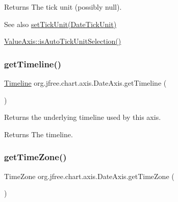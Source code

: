 \begin{DoxyReturn}{Returns}
The tick unit (possibly {\ttfamily null}).
\end{DoxyReturn}
\begin{DoxySeeAlso}{See also}
\mbox{\hyperlink{classorg_1_1jfree_1_1chart_1_1axis_1_1_date_axis_a9a28298c67b281bc6f4dccff9af3fd59}{set\+Tick\+Unit(\+Date\+Tick\+Unit)}} 

\mbox{\hyperlink{classorg_1_1jfree_1_1chart_1_1axis_1_1_value_axis_adc265a92cee6f4f50dcf0701f86d3cab}{Value\+Axis\+::is\+Auto\+Tick\+Unit\+Selection()}} 
\end{DoxySeeAlso}
\mbox{\label{classorg_1_1jfree_1_1chart_1_1axis_1_1_date_axis_aa20fc8c4e5f6f50e17018e6e9e32fc33}} 
\subsubsection{\texorpdfstring{get\+Timeline()}{getTimeline()}}
{\footnotesize\ttfamily \mbox{\hyperlink{interfaceorg_1_1jfree_1_1chart_1_1axis_1_1_timeline}{Timeline}} org.\+jfree.\+chart.\+axis.\+Date\+Axis.\+get\+Timeline (\begin{DoxyParamCaption}{ }\end{DoxyParamCaption})}

Returns the underlying timeline used by this axis.

\begin{DoxyReturn}{Returns}
The timeline. 
\end{DoxyReturn}
\mbox{\label{classorg_1_1jfree_1_1chart_1_1axis_1_1_date_axis_a93837dafa9a6141a5c995a5c2b40f936}} 
\subsubsection{\texorpdfstring{get\+Time\+Zone()}{getTimeZone()}}
{\footnotesize\ttfamily Time\+Zone org.\+jfree.\+chart.\+axis.\+Date\+Axis.\+get\+Time\+Zone (\begin{DoxyParamCaption}{ }\end{DoxyParamCaption})}

